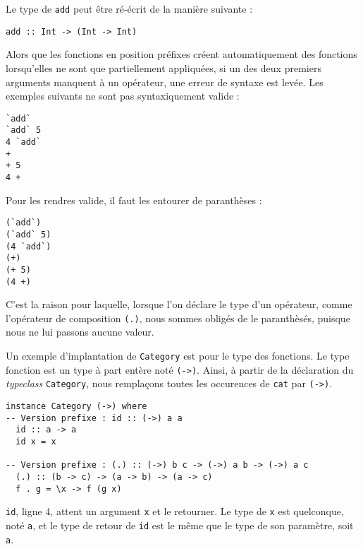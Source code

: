 \documentclass{llncs}
\begin{document}
Le type de \lstinline{add} peut être ré-écrit de la manière suivante :
\begin{lstlisting}
add :: Int -> (Int -> Int)
\end{lstlisting}

Alors que les fonctions en position préfixes créent automatiquement des fonctions
lorsqu'elles ne sont que partiellement appliquées, si un des deux premiers arguments
manquent à un opérateur, une erreur de syntaxe est levée.
Les exemples suivants ne sont pas syntaxiquement valide :
\begin{lstlisting}
`add`
`add` 5
4 `add`
+
+ 5
4 +
\end{lstlisting}

Pour les rendres valide, il faut les entourer de paranthèses :
\begin{lstlisting}
(`add`)
(`add` 5)
(4 `add`)
(+)
(+ 5)
(4 +)
\end{lstlisting}

C'est la raison pour laquelle, lorsque l'on déclare le type d'un opérateur, comme
l'opérateur de composition \lstinline{(.)}, nous sommes obligés de le paranthèsés,
puisque nous ne lui passons aucune valeur.

Un exemple d'implantation de \lstinline{Category} est pour le type des fonctions.
Le type fonction est un type à part entère noté \lstinline{(->)}.
Ainsi, à partir de la déclaration du \emph{typeclass} \lstinline{Category}, nous
remplaçons toutes les occurences de \lstinline{cat} par \lstinline{(->)}.
\begin{lstlisting}
instance Category (->) where
-- Version prefixe : id :: (->) a a
  id :: a -> a
  id x = x

-- Version prefixe : (.) :: (->) b c -> (->) a b -> (->) a c
  (.) :: (b -> c) -> (a -> b) -> (a -> c)
  f . g = \x -> f (g x)
\end{lstlisting}

\lstinline{id}, ligne 4, attent un argument \lstinline{x} et le retourner.
Le type de \lstinline{x} est quelconque, noté \lstinline{a}, et le type de retour
de \lstinline{id} est le même que le type de son paramètre, soit \lstinline{a}.
\end{document}
